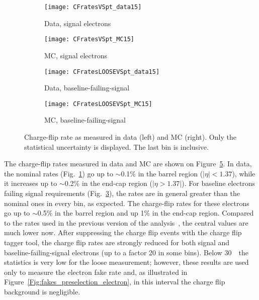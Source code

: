 \begin{figure}[t!]
\centering
\begin{subfigure}[b]{0.45\textwidth}
	\texttt{[image: CFratesVSpt\_data15]}
	\caption{Data, signal electrons}\label{fig:Chflip_nominalData}
\end{subfigure}
\begin{subfigure}[b]{0.45\textwidth}
	\texttt{[image: CFratesVSpt\_MC15]}
	\caption{MC, signal electrons}\label{fig:Chflip_nominalMC}
\end{subfigure}
\begin{subfigure}[b]{0.45\textwidth}
	\texttt{[image: CFratesLOOSEVSpt\_data15]}
	\caption{Data, baseline-failing-signal}\label{fig:Chflip_looseData}
\end{subfigure}
\begin{subfigure}[b]{0.45\textwidth}
	\texttt{[image: CFratesLOOSEVSpt\_MC15]}
	\caption{MC, baseline-failing-signal}\label{fig:Chflip_looseMC}
\end{subfigure}
\caption{Charge-flip rate as measured in data (left) and MC (right). 
Only the statistical uncertainty is displayed. The last \pt bin is inclusive.}
\label{fig:ChFlip_Rate}
\end{figure}

The charge-flip rates measured in data and MC are shown on Figure~\ref{fig:ChFlip_Rate}. 
 In data, the nominal rates (Fig.~\ref{fig:Chflip_nominalData}) go up to $\sim$0.1\% in the barrel region ($|\eta| < 1.37$), 
 while it increases up to $\sim$0.2\% in the end-cap region ($|\eta > 1.37|$). 
 For baseline electrons failing signal requirements (Fig.~\ref{fig:Chflip_looseData}), 
 the rates are in general greater than the nominal ones in every bin, as expected. The charge-flip rates for these electrons go up to $\sim$0.5\% in the barrel region and up 1\% in the end-cap region. Compared to the rates used in the previous version of the analysis~\cite{ATLAS-CONF-2016-037}, the central values are much lower now. After suppressing the charge flip events with the charge flip
tagger tool, the charge flip rates are strongly reduced for both signal and baseline-failing-signal electrons (up to a factor 20 in some bins). Below 30~\GeV\, the statistics is very low for the loose measurement; however, these results are used only to measure the electron fake rate and, as illustrated in Figure~\ref{Fig:fakes_preselection_electron}, in this \pt interval the charge flip background is negligible.


